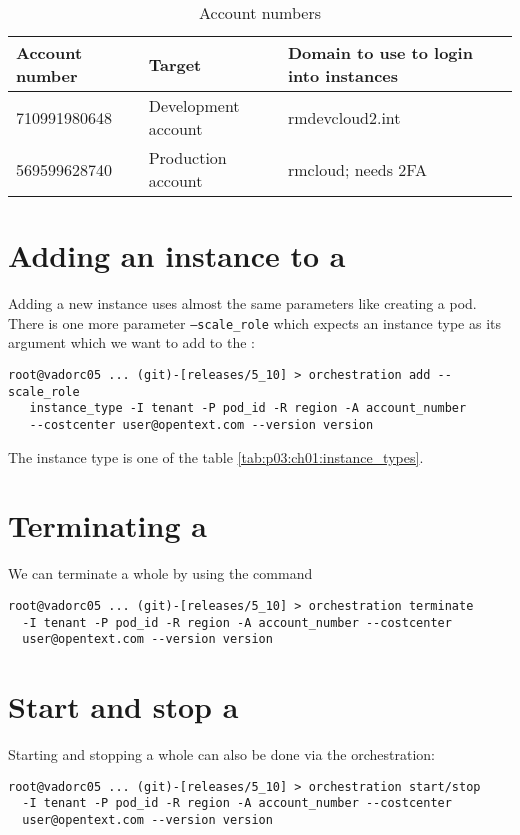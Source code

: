 	\begin{table}[h]
         \center
         \caption{\aws{} Account numbers}
         \begin{tabular}{| l | l | l |}
           \hline
           \textbf{Account number} & \textbf{Target} & \textbf{Domain to use to login into instances} \\ \hline
           710991980648 & Development account  & rmdevcloud2.int \\ \hline
           569599628740 & Production account &  rmcloud; needs 2FA\\ \hline
         \end{tabular}
         \label{tab:p03:ch01:aws_account_nums}
      \end{table}
	
	\section{Adding an instance to a \pod{}}
	Adding a new instance uses almost the same parameters like creating a pod. There is one more parameter \texttt{--scale_role}
	which expects an instance type as its argument which we want to add to the \pod{}:
	\begin{verbatim}
root@vadorc05 ... (git)-[releases/5_10] > orchestration add --scale_role
   instance_type -I tenant -P pod_id -R region -A account_number 
   --costcenter user@opentext.com --version version
	\end{verbatim}
	The instance type is one of the table \ref{tab:p03:ch01:instance_types}.

	\section{Terminating a \pod{}}
	We can terminate a whole \pod{} by using the command
	\begin{verbatim}
root@vadorc05 ... (git)-[releases/5_10] > orchestration terminate 
  -I tenant -P pod_id -R region -A account_number --costcenter 
  user@opentext.com --version version
	\end{verbatim}
	
	\section{Start and stop a \pod{}}
	Starting and stopping a whole \pod{} can also be done via the orchestration:
	\begin{verbatim}
root@vadorc05 ... (git)-[releases/5_10] > orchestration start/stop 
  -I tenant -P pod_id -R region -A account_number --costcenter 
  user@opentext.com --version version
	\end{verbatim}

